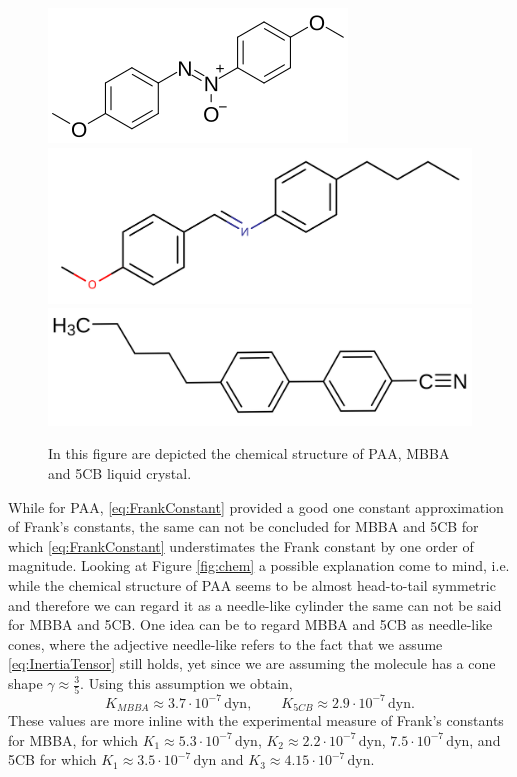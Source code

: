 \documentclass[%
 aip,
 amsmath,amssymb,
 reprint,%
]{revtex4-1}
\begin{document}
\begin{figure}
  \includegraphics[scale=0.4]{Figures/PAA}\\
  \includegraphics[scale=0.11]{Figures/MBBA}
  \includegraphics[scale=0.085]{Figures/5CB}
  \caption{In this figure are depicted the chemical structure of PAA, MBBA and 5CB liquid crystal.}
\end{figure}

While for PAA, \eqref{eq:FrankConstant} provided a good one constant approximation of Frank's constants, the same can not be concluded for MBBA and 5CB for which \eqref{eq:FrankConstant} understimates the Frank constant by one order of magnitude.
Looking at Figure \ref{fig:chem} a possible explanation come to mind, i.e. while the chemical structure of PAA seems to be almost head-to-tail symmetric and therefore we can regard it as a needle-like cylinder the same can not be said for MBBA and 5CB.
One idea can be to regard MBBA and 5CB as needle-like cones, where the adjective needle-like refers to the fact that we assume \eqref{eq:InertiaTensor} still holds, yet since we are assuming the molecule has a cone shape $\gamma\approx\frac{3}{5}$.
Using this assumption we obtain,
\begin{equation}
  K_{MBBA} \approx 3.7 \cdot 10^{-7}\,\text{dyn}, \qquad K_{5CB}\approx 2.9\cdot 10^{-7}\,\text{dyn}.
\end{equation}
These values are more inline with the experimental measure of Frank's constants for MBBA, for which $K_1 \approx 5.3 \cdot 10^{-7}\,\text{dyn}$, $K_2 \approx 2.2 \cdot 10^{-7}\,\text{dyn}$, $7.5\cdot 10^{-7}\, \text{dyn}$\cite{dGJ}, and 5CB for which $K_1\approx 3.5\cdot 10^{-7}\,\text{dyn}$ and $K_3\approx 4.15\cdot 10^{-7}\,\text{dyn}$\cite{BRBF85}.
\end{document}
